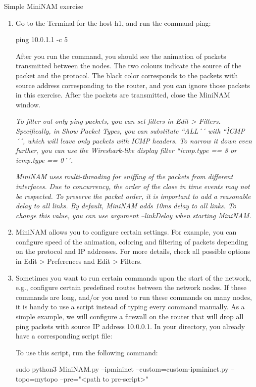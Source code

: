 \begin{exercise}{Simple MiniNAM exercise}
\begin{enumerate}
		\item Go to the Terminal for the host h1, and run the command ping:
		\begin{cmdblock}[gobble=1]
	ping 10.0.1.1 -c 5
		\end{cmdblock}
		After you run the command, you should see the animation of packets transmitted between the nodes. The two colours indicate the source of the packet and the protocol. The black color corresponds to the packets with source address corresponding to the router, and you can ignore those packets in this exercise. After the packets are transmitted, close the MiniNAM window.
		
		
		\emph{\remark To filter out only ping packets, you can set filters in Edit > Filters. Specifically, in Show Packet Types, you can substitute ``ALL´´ with ``ÌCMP´´, which will leave only packets with ICMP headers. To narrow it down even further, you can use the Wireshark-like display filter ``icmp.type == 8 or icmp.type == 0´´.}
		
		\emph{\remark MiniNAM uses multi-threading for sniffing of the packets from different interfaces. Due to concurrency, the order of the close in time events may not be respected. To preserve the packet order, it is important to add a reasonable delay to all links. By default, MiniNAM adds 10ms delay to all links. To change this value, you can use argument --linkDelay when starting MiniNAM.}
		
		\item MiniNAM allows you to configure certain settings. For example, you can configure speed of the animation, coloring and filtering of packets depending on the protocol and IP addresses. For more details, check all possible options in Edit > Preferences and Edit > Filters.
		
		\item Sometimes you want to run certain commands upon the start of the network, e.g., configure certain predefined routes between the network nodes. If these commands are long, and/or you need to run these commands on many nodes, it is handy to use a script instead of typing every command manually. As a simple example, we will configure a firewall on the router that will drop all ping packets with source IP address 10.0.0.1. In your  directory, you already have a corresponding script file:
		
		To use this script, run the following command:
		\begin{cmdblock}[gobble=1]
	sudo python3 MiniNAM.py --ipmininet --custom=custom-ipmininet.py --topo=mytopo
	--pre="<path to pre-script>"
		\end{cmdblock}
	
		
	\end{enumerate}
	
\end{exercise}
